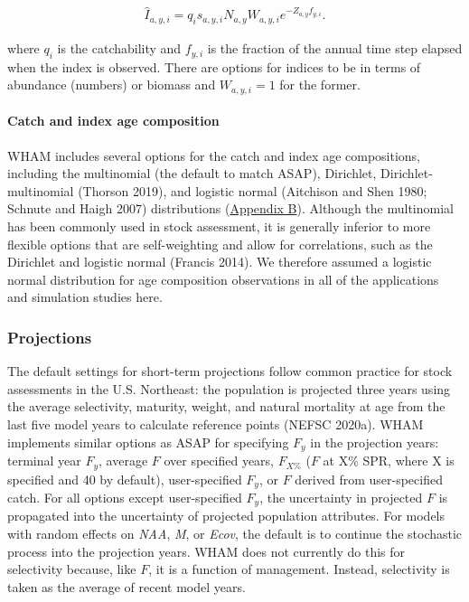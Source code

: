 \documentclass[]{article}
\let\oldparagraph\paragraph
\renewcommand{\paragraph}[1]{\oldparagraph{#1}\mbox{}}
\begin{document}
\begin{equation}
\label{eq:predindex}
  \begin{array}{c}
    \hat{I}_{a,y,i} = q_i s_{a,y,i} N_{a,y}W_{a,y,i} e^{-Z_{a,y}f_{y,i}}.
  \end{array}
\end{equation}

where \(q_i\) is the catchability and \(f_{y,i}\) is the fraction of the
annual time step elapsed when the index is observed. There are options
for indices to be in terms of abundance (numbers) or biomass and
\(W_{a,y,i} = 1\) for the former.

\hypertarget{catch-and-index-age-composition}{%
\paragraph{Catch and index age
composition}\label{catch-and-index-age-composition}}

WHAM includes several options for the catch and index age compositions,
including the multinomial (the default to match ASAP), Dirichlet,
Dirichlet-multinomial (Thorson 2019), and logistic normal (Aitchison and
Shen 1980; Schnute and Haigh 2007) distributions
(\protect\hyperlink{appendix-b}{Appendix B}). Although the multinomial
has been commonly used in stock assessment, it is generally inferior to
more flexible options that are self-weighting and allow for
correlations, such as the Dirichlet and logistic normal (Francis 2014).
We therefore assumed a logistic normal distribution for age composition
observations in all of the applications and simulation studies here.

\hypertarget{projections}{%
\subsubsection{Projections}\label{projections}}

The default settings for short-term projections follow common practice
for stock assessments in the U.S. Northeast: the population is projected
three years using the average selectivity, maturity, weight, and natural
mortality at age from the last five model years to calculate reference
points (NEFSC 2020a). WHAM implements similar options as ASAP for
specifying \(F_y\) in the projection years: terminal year \(F_y\),
average \(F\) over specified years, \(F_{X\%}\) (\(F\) at X\% SPR, where
X is specified and 40 by default), user-specified \(F_y\), or \(F\)
derived from user-specified catch. For all options except user-specified
\(F_y\), the uncertainty in projected \(F\) is propagated into the
uncertainty of projected population attributes. For models with random
effects on \emph{NAA}, \emph{M}, or \emph{Ecov}, the default is to
continue the stochastic process into the projection years. WHAM does not
currently do this for selectivity because, like \(F\), it is a function
of management. Instead, selectivity is taken as the average of recent
model years.
\end{document}
